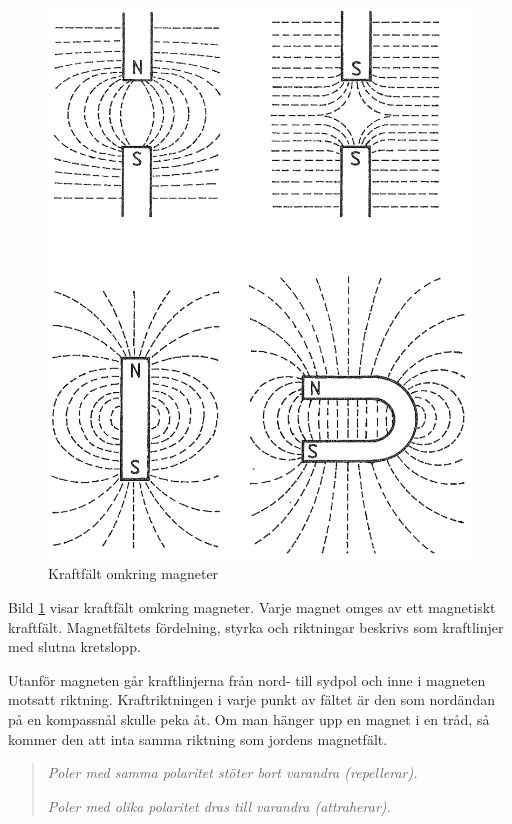 \begin{figure}
  \includegraphics[width=\textwidth]{images/cropped_pdfs/bild_2_1-07.pdf}
  \caption{Kraftfält omkring magneter}
  \label{fig:BildII1-7}
\end{figure}

Bild \ref{fig:BildII1-7} visar kraftfält omkring magneter.
Varje magnet omges av ett magnetiskt kraftfält.
Magnetfältets fördelning, styrka och riktningar beskrivs som kraftlinjer med
slutna kretslopp.

Utanför magneten går kraftlinjerna från nord- till sydpol och inne i magneten
motsatt riktning.
Kraftriktningen i varje punkt av fältet är den som nordändan på en kompassnål
skulle peka åt.
Om man hänger upp en magnet i en tråd, så kommer den att inta samma riktning
som jordens magnetfält.

\begin{quote}
\emph{Poler med samma polaritet stöter bort varandra (repellerar).}

\emph{Poler med olika polaritet dras till varandra (attraherar).}
\end{quote}

